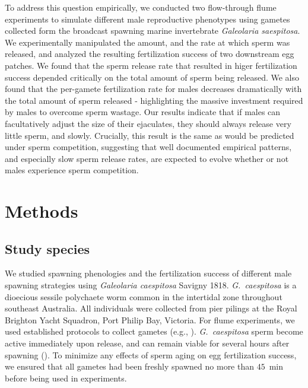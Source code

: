 \documentclass{article}
\begin{document}
To address this question empirically, we conducted two flow-through flume experiments to simulate different male reproductive phenotypes using gametes collected form the broadcast spawning marine invertebrate \textit{Galeolaria saespitosa}. We experimentally manipulated the amount, and the rate at which sperm was released, and analyzed the resulting fertilization success of two downstream egg patches. We found that the sperm release rate that resulted in higer fertilization success depended critically on the total amount of sperm being released. We also found that the per-gamete fertilization rate for males decreases dramatically with the total amount of sperm released - highlighting the massive investment required by males to overcome sperm wastage. Our results indicate that if males can facultatively adjust the size of their ejaculates, they should always release very little sperm, and slowly. Crucially, this result is the same as would be predicted under sperm competition, suggesting that well documented empirical patterns, and especially slow sperm release rates, are expected to evolve whether or not males experience sperm competition.


\section*{Methods}

	\subsection*{Study species}
	We studied spawning phenologies and the fertilization success of different male spawning strategies using \textit{Galeolaria caespitosa} Savigny 1818. \textit{G.~caespitosa} is a dioecious sessile polychaete worm common in the intertidal zone throughout southeast Australia. All individuals were collected from pier pilings at the Royal Brighton Yacht Squadron, Port Philip Bay, Victoria. For flume experiments, we used established protocols to collect gametes (e.g., \citealt{MarshallEvans2005a, MarshallEvans2005b}). \textit{G.~caespitosa} sperm become active immediately upon release, and can remain viable for several hours after spawning (\citealt{Kupriyanova2013}). To minimize any effects of sperm aging on egg fertilization success, we ensured that all gametes had been freshly spawned no more than $45$~min before being used in experiments.
\end{document}
